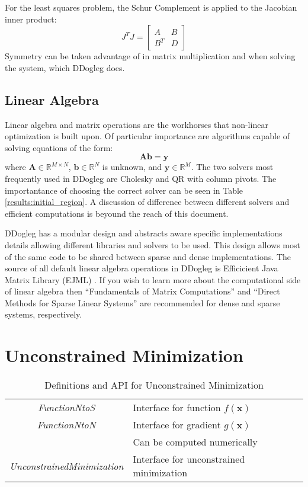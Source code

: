 \documentclass[peerreview,compsoc,onecolumn]{IEEEtran}
\newcommand{\R}{\mathbb{R}}
\begin{document}
For the least squares problem, the Schur Complement is applied to the Jacobian inner product:
\begin{equation}
J^T J =
\begin{bmatrix}
A & B \\
B^T & D
\end{bmatrix}
\end{equation}
Symmetry can be taken advantage of in matrix multiplication and when solving the system, which DDogleg does.

\subsection{Linear Algebra}

Linear algebra and matrix operations are the workhorses that non-linear optimization is built upon. Of particular importance are algorithms capable of solving equations of the form:
\begin{equation}
\bm{A}\bm{b} = \bm{y}
\end{equation}
where $\bm{A} \in \R^{M \times N}$, $\bm{b} \in \R^N$ is unknown, and $\bm{y} \in \R^M$. The two solvers most frequently used in DDogleg are Cholesky and QR with column pivots. The importantance of choosing the correct solver can be seen in Table \ref{results:initial_region}. A discussion of difference between different solvers and efficient computations is beyound the reach of this document.

DDogleg has a modular design and abstracts aware specific implementations details allowing different libraries and solvers to be used. This design allows most of the same code to be shared between sparse and dense implementations. The source of all default linear algebra operations in DDogleg is Efficicient Java Matrix Library (EJML) \cite{ejml2018}. If you wish to learn more about the computational side of linear algebra then ``Fundamentals of Matrix Computations'' \cite{watkins2010} and ``Direct Methods for Sparse Linear Systems'' \cite{davis2006} are recommended for dense and sparse systems, respectively.

\section{Unconstrained Minimization}

\begin{table}[h]
\centering
\caption{\label{definitions:UM}Definitions and API for Unconstrained Minimization}
\begin{tabular}{cl}
\textit{FunctionNtoS} & Interface for function $f(\bm{x})$ \\
\textit{FunctionNtoN} & Interface for gradient $g(\bm{x})$ \\
& Can be computed numerically \\
\textit{UnconstrainedMinimization} & Interface for unconstrained minimization
\end{tabular}
\end{table}
\end{document}
